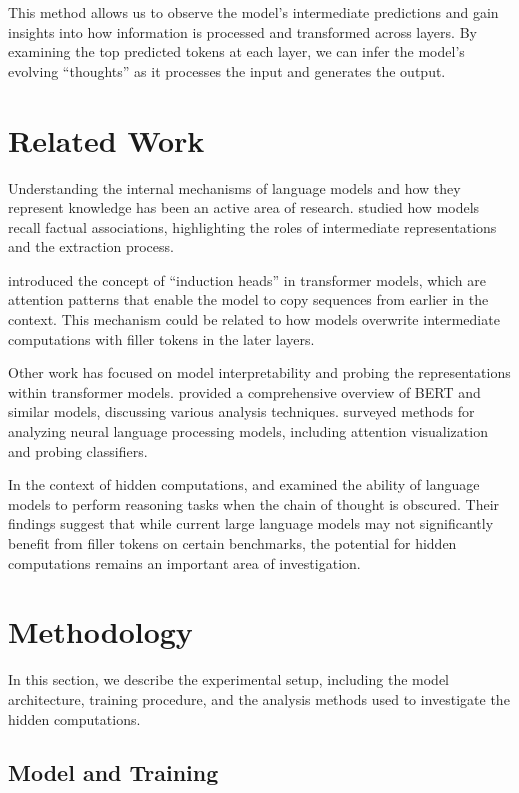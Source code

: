 \documentclass{article}
\begin{document}
This method allows us to observe the model's intermediate predictions and gain insights into how information is processed and transformed across layers. By examining the top predicted tokens at each layer, we can infer the model's evolving ``thoughts'' as it processes the input and generates the output.

\section{Related Work}

Understanding the internal mechanisms of language models and how they represent knowledge has been an active area of research. \cite{geva2020dissecting} studied how models recall factual associations, highlighting the roles of intermediate representations and the extraction process.

\cite{elhage2021mathematical} introduced the concept of ``induction heads'' in transformer models, which are attention patterns that enable the model to copy sequences from earlier in the context. This mechanism could be related to how models overwrite intermediate computations with filler tokens in the later layers.

Other work has focused on model interpretability and probing the representations within transformer models. \cite{rogers2020primer} provided a comprehensive overview of BERT and similar models, discussing various analysis techniques. \cite{belinkov2019analysis} surveyed methods for analyzing neural language processing models, including attention visualization and probing classifiers.

In the context of hidden computations, \cite{lanham2023measuring} and \cite{madaan2023self} examined the ability of language models to perform reasoning tasks when the chain of thought is obscured. Their findings suggest that while current large language models may not significantly benefit from filler tokens on certain benchmarks, the potential for hidden computations remains an important area of investigation.

\section{Methodology}

In this section, we describe the experimental setup, including the model architecture, training procedure, and the analysis methods used to investigate the hidden computations.

\subsection{Model and Training}
\end{document}
